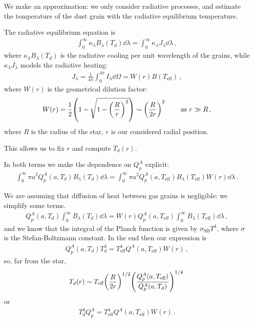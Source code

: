 \documentclass[main.tex]{subfiles}
\begin{document}
We make an approximation: we only consider radiative processes, and estimate the temperature of the dust grain with the radiative equilibrium temperature. 

The radiative equilibrium equation is 
%
\begin{align}
  \int_{0}^{ \infty } \kappa_{\lambda } B_{\lambda }(T_d) \dd{\lambda }
  = \int_{0}^{ \infty } \kappa_{\lambda } J_{\lambda } \dd{\lambda }
\,,
\end{align}
%
where \(\kappa_{\lambda } B_{\lambda } (T_d)\) is the radiative cooling per unit wavelength of the grains, while \(\kappa_{\lambda } J_{\lambda }\) models the radiative heating:
%
\begin{align}
  J_{\lambda } = \frac{1}{4 \pi } \int_{0}^{4 \pi } I_{\lambda } \dd{\Omega } = W(r) B( T _{\text{eff}})
\,,
\end{align}
%
where \(W(r)\) is the geometrical dilution factor: 
%
\begin{align}
  W(r ) = \frac{1}{2} \qty(1 - \sqrt{1 - \qty(\frac{R}{r})^2}) \sim \qty(\frac{R}{2r})^2
\qquad \text{ as } r \gg R
\,,
\end{align}
%
where \(R\) is the radius of the star, \(r\) is our considered radial position.

This allows us to fix \(r\) and compute \(T_d (r)\). 


In both terms we make the dependence on \(Q_p^{A}\) explicit: 
%
\begin{align}
  \int_{0}^{ \infty } \pi a^2 Q_p^{A} (a, T_d) B_\lambda (T_d) \dd{\lambda } =
  \int_{0}^{ \infty } \pi a^2 Q_p^{A} (a, T _{\text{eff}}) B_\lambda (T _{\text{eff}}) W(r) \dd{\lambda }
\,.
\end{align}

We are assuming that diffusion of heat between gas grains is negligible: we simplify some terms. 
%
\begin{align}
  Q_p^{A} (a, T_d ) \int_{0}^{ \infty } B_\lambda(T_d) \dd{\lambda }
  = W(r) Q_p^{A} (a, T _{\text{eff}}) \int_{0}^{ \infty }
  B_\lambda (T _{\text{eff}}) \dd{\lambda }
\,,
\end{align}
%
and we know that the integral of the Planck function is given by \(\sigma _{\text{SB}} T^{4}\), where \(\sigma \) is the Stefan-Boltzmann constant. In the end then our expression is 
%
\begin{align}
  Q_p^{A} (a, T_d) T_d^{4} = T^{4} _{\text{eff}} Q^{A}(a, T _{\text{eff}}) W(r)
\,,
\end{align}
%
so, far from the star,
%
\begin{align}
  T_d(r) \sim T _{\text{eff}} \qty(\frac{R}{2r})^{1/2} \qty(\frac{Q^{A}_{p} (a, T _{\text{eff}})}{Q^{A}_{p} (a,T_{d})})^{1/4}
\,
\end{align}
%
or 
%
\begin{align}
T_d^{4} Q_p^{A} = T _{\text{eff}}^{4} Q^{A} (a, T _{\text{eff}}) W(r)
\,.
\end{align}
%
\end{document}
